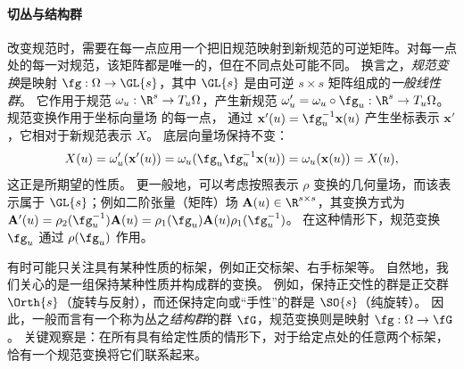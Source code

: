 
%


\paragraph{切丛与结构群}
改变规范时，需要在每一点应用一个把旧规范映射到新规范的可逆矩阵。对每一点处的每一对规范，该矩阵都是唯一的，但在不同点处可能不同。
%
换言之，{\em 规范变换}是映射 $\fg : \Omega \rightarrow \GL{s}$，其中 $\GL{s}$ 是由可逆 $s \times s$ 矩阵组成的{\em 一般线性群}。
它作用于规范 $\omega_u : \R^s \rightarrow T_u \Omega$，产生新规范 $\omega'_u = \omega_u \circ \fg_u : \R^s \rightarrow T_u \Omega$。
%
规范变换作用于坐标向量场%
的每一点，
通过 $\mathbf{x}'(u) = \fg^{-1}_u \mathbf{x}(u)$ 产生坐标表示 $\mathbf{x}'$，它相对于新规范表示 $X$。
%
底层向量场保持不变：
$$
X(u) = \omega'_u(\mathbf{x'}(u)) = \omega_u( \fg_u \fg^{-1}_u \mathbf{x}(u)) = \omega_u(\mathbf{x}(u)) = X(u), 
$$
这正是所期望的性质。
%
%
%
更一般地，可以考虑按照表示 $\rho$ 变换的几何量场，而该表示属于 $\GL{s}$；例如二阶张量（矩阵）场 $\mathbf{A}(u) \in \R^{s \times s}$，其变换方式为 $\mathbf{A'}(u) = \rho_2(\fg^{-1}_u) \mathbf{A}(u) = \rho_1(\fg_u) \mathbf{A}(u) \rho_1(\fg^{-1}_u)$。%
在这种情形下，规范变换 $\fg_u$ 通过 $\rho(\fg_u)$ 作用。

有时可能只关注具有某种性质的标架，例如正交标架、右手标架等。
自然地，我们关心的是一组保持某种性质并构成群的变换。
例如，保持正交性的群是正交群 $\Orth{s}$（旋转与反射），而还保持定向或“手性”的群是 $\SO{s}$（纯旋转）。
因此，一般而言有一个称为丛之\emph{结构群}的群 $\fG$，规范变换则是映射 $\fg : \Omega \rightarrow \fG$。
关键观察是：在所有具有给定性质的情形下，对于给定点处的任意两个标架，恰有一个规范变换将它们联系起来。


